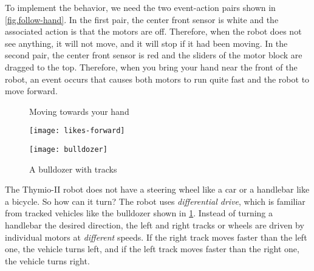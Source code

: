 
To implement the behavior, we need the two event-action pairs shown in
\cref{fig.follow-hand}. In the first pair, the center front sensor
is white and the associated action is that the motors are off.
Therefore, when the robot does not see anything, it will not move, and it
will stop if it had been moving. In the second pair, the center front
sensor is red and the sliders of the motor block are dragged to the top.
Therefore, when you bring your hand near the front of the robot, an event occurs that causes both motors to run quite fast and the robot to move forward.

\begin{figure}
\begin{floatrow}
	\ffigbox
	{\caption{Moving towards your hand}\label{fig.follow-hand}}
	{\texttt{[image: likes-forward]}}
	\ffigbox
	{\caption{A bulldozer with tracks}\label{fig.bull}}
	{\texttt{[image: bulldozer]}}
\end{floatrow}
\end{figure}



The Thymio-II robot does not have a steering wheel like a car or a
handlebar like a bicycle. So how can it turn? The robot uses
\emph{differential drive}, which is familiar from tracked vehicles like the
bulldozer shown in \cref{fig.bull}. Instead of turning a handlebar the
desired direction, the left and right tracks or wheels are driven by
individual motors at \emph{different} speeds. If the right track moves
faster than the left one, the vehicle turns left, and if the left track
moves faster than the right one, the vehicle turns right.


